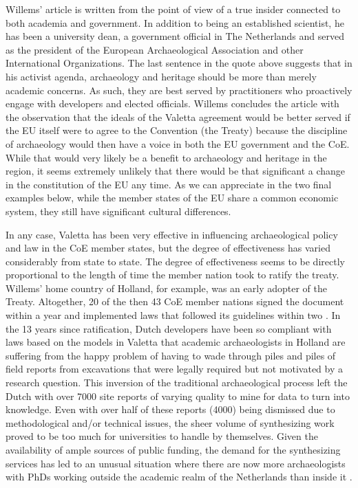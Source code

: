 \documentclass[english]{ijsra}
\begin{document}
Willems’ article is written from the point of view of a true insider connected to both academia and government. In addition to being an established scientist, he has been a university dean, a government official in The Netherlands and served as the president of the European Archaeological Association and other International Organizations. The last sentence in the quote above suggests that in his activist agenda, archaeology and heritage should be more than merely academic concerns. As such, they are best served by practitioners who proactively engage with developers and elected officials. Willems concludes the article with the observation that the ideals of the Valetta agreement would be better served if the EU itself were to agree to the Convention (the Treaty) because the discipline of archaeology would then have a voice in both the EU government and the CoE. While that would very likely be a benefit to archaeology and heritage in the region, it seems extremely unlikely that there would be that significant a change in the constitution of the EU any time. As we can appreciate in the two final examples below, while the member states of the EU share a common economic system, they still have significant cultural differences.  


In any case, Valetta has been very effective in influencing archaeological policy and law in the CoE member states, but the degree of effectiveness has varied considerably from state to state. The degree of effectiveness seems to be directly proportional to the length of time the member nation took to ratify the treaty. Willems’ home country of Holland, for example, was an early adopter of the Treaty. Altogether, 20 of the then 43 CoE member nations signed the document within a year and implemented laws that followed its guidelines within two \parencite[58]{Willems_2007}. 
In the 13 years since ratification, Dutch developers have been so compliant with laws based on the models in Valetta that academic archaeologists in Holland are suffering from the happy problem of having to wade through piles and piles of field reports from excavations that were legally required but not motivated by a research question. This inversion of the traditional archaeological process left the Dutch with over \num{7000} site reports of varying quality to mine for data to turn into knowledge. Even with over half of these reports (\num{4000}) being dismissed due to methodological and/or technical issues, the sheer volume of synthesizing work proved to be too much for universities to handle by themselves. 
Given the availability of ample sources of public funding, the demand for the synthesizing services has led to an unusual situation where there are now more archaeologists with PhDs working outside the academic realm of the Netherlands than inside it \parencite[93]{Groenewoudt_2014}.  
\end{document}
